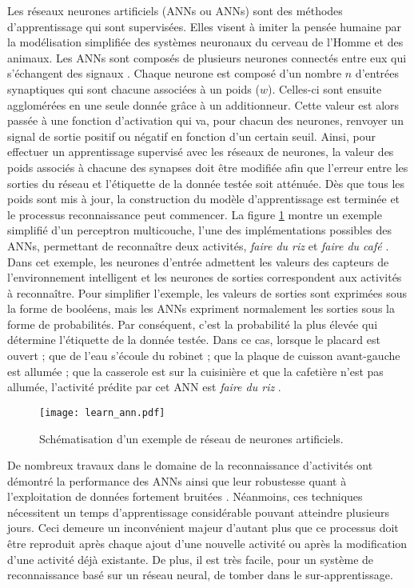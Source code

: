 Les réseaux neurones artificiels (\aclp{ANN} ou \acsp{ANN}) sont des méthodes d’apprentissage qui sont supervisées. Elles visent à imiter la pensée humaine par la modélisation simplifiée des systèmes neuronaux du cerveau de l’Homme et des animaux. Les \acsp{ANN} sont composés de plusieurs neurones connectés entre eux qui s’échangent des signaux \citep{Witten2011}. Chaque neurone est composé d'un nombre $n$ d'entrées synaptiques qui sont chacune associées à un poids ($w$). Celles-ci sont ensuite agglomérées en une seule donnée grâce à un additionneur. Cette valeur est alors passée à une fonction d'activation qui va, pour chacun des neurones, renvoyer un signal de sortie positif ou négatif en fonction d'un certain seuil. Ainsi, pour effectuer un apprentissage supervisé avec les réseaux de neurones, la valeur des poids associés à chacune des synapses doit être modifiée afin que l’erreur entre les sorties du réseau et l'étiquette de la donnée testée soit atténuée. Dès que tous les poids sont mis à jour, la construction du modèle d'apprentissage est terminée et le processus reconnaissance peut commencer. La figure \ref{fig:learn_ann} montre un exemple simplifié d'un perceptron multicouche, l'une des implémentations possibles des \acsp{ANN}, permettant de reconnaître deux activités, \og \textit{faire du riz} \fg et \og \textit{faire du café} \fg. Dans cet exemple, les neurones d'entrée admettent les valeurs des capteurs de l'environnement intelligent et les neurones de sorties correspondent aux activités à reconnaître. Pour simplifier l'exemple, les valeurs de sorties sont exprimées sous la forme de booléens, mais les \acsp{ANN} expriment normalement les sorties sous la forme de probabilités. Par conséquent, c'est la probabilité la plus élevée qui détermine l'étiquette de la donnée testée. Dans ce cas, lorsque le placard est ouvert ; que de l'eau s'écoule du robinet ; que la plaque de cuisson avant-gauche est allumée ; que la casserole est sur la cuisinière et que la cafetière n'est pas allumée, l'activité prédite par cet \acs{ANN} est \og \textit{faire du riz} \fg.

\begin{figure}[H]
	\centering
	\texttt{[image: learn\_ann.pdf]}
	\caption{Schématisation d'un exemple de réseau de neurones artificiels.}
	\label{fig:learn_ann}
\end{figure}

De nombreux travaux dans le domaine de la reconnaissance d'activités ont démontré la performance des \acsp{ANN} ainsi que leur robustesse quant à l'exploitation de données fortement bruitées \citep{Parkka2006, Delachaux2013}. Néanmoins, ces techniques nécessitent un temps d'apprentissage considérable pouvant atteindre plusieurs jours. Ceci demeure un inconvénient majeur d'autant plus que ce processus doit être reproduit après chaque ajout d'une nouvelle activité ou après la modification d'une activité déjà existante. De plus, il est très facile, pour un système de reconnaissance basé sur un réseau neural, de tomber dans le sur-apprentissage.

